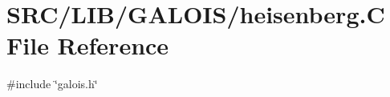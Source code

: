 \hypertarget{heisenberg_8_c}{}\section{S\+R\+C/\+L\+I\+B/\+G\+A\+L\+O\+I\+S/heisenberg.C File Reference}
\label{heisenberg_8_c}
{\ttfamily \#include \char`\"{}galois.\+h\char`\"{}}\newline
